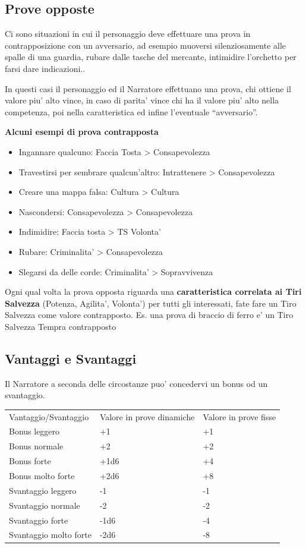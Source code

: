 \documentclass[a4paper,11pt,twoside,openany]{dndbook}
\begin{document}
\subsection{Prove opposte}

Ci sono situazioni in cui il personaggio deve effettuare una prova in contrapposizione con un avversario, ad esempio muoversi silenziosamente alle spalle di una guardia, rubare dalle tasche del mercante, intimidire l'orchetto per farsi dare indicazioni..

In questi casi il personaggio ed il Narratore effettuano una prova, chi ottiene il valore piu' alto vince, in caso di parita' vince chi ha il valore piu' alto nella competenza, poi nella caratteristica ed infine l'eventuale ``avversario''.

\bigskip

\textbf{Alcuni esempi di prova contrapposta}

\begin{itemize}
\item Ingannare qualcuno: Faccia Tosta \textgreater{} Consapevolezza
\item Travestirsi per sembrare qualcun'altro: Intrattenere \textgreater{} Consapevolezza
\item Creare una mappa falsa: Cultura \textgreater{} Cultura
\item Nascondersi: Consapevolezza \textgreater{} Consapevolezza
\item Indimidire: Faccia tosta \textgreater{} TS Volonta'
\item Rubare: Criminalita' \textgreater{} Consapevolezza
\item Slegarsi da delle corde: Criminalita' \textgreater{} Sopravvivenza
\end{itemize}

Ogni qual volta la prova opposta riguarda una \textbf{caratteristica correlata ai Tiri Salvezza} (Potenza, Agilita', Volonta') per tutti gli interessati, fate fare un Tiro Salvezza come valore contrapposto. Es. una prova di braccio di ferro e' un Tiro Salvezza Tempra contrapposto

\bigskip

\subsection{Vantaggi e Svantaggi}

Il Narratore a seconda delle circostanze puo' concedervi un bonus od un svantaggio.

\begin{tabular}[c]{@{}lll@{}}
\toprule 
Vantaggio/Svantaggio & Valore in prove dinamiche & Valore in prove fisse\tabularnewline
Bonus leggero & +1 & +1\tabularnewline
Bonus normale & +2 & +2\tabularnewline
Bonus forte & +1d6 & +4\tabularnewline
Bonus molto forte & +2d6 & +8\tabularnewline
Svantaggio leggero & -1 & -1\tabularnewline
Svantaggio normale & -2 & -2\tabularnewline
Svantaggio forte & -1d6 & -4\tabularnewline
Svantaggio molto forte & -2d6 & -8\tabularnewline
\bottomrule
\end{tabular}
\end{document}
